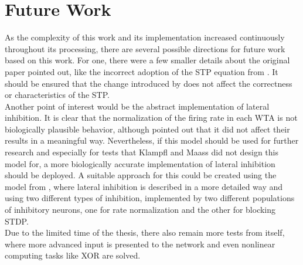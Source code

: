 \section{Future Work}
As the complexity of this work and its implementation increased continuously throughout its processing, there are several possible directions for future work based on this work. 
For one, there were a few smaller details about the original paper pointed out, like the incorrect adoption of the STP equation from \parencite{markram_wang_tsodyks_1998}. It should be ensured that the change introduced by \parencite{klampfl_maass_2013} does not affect the correctness or characteristics of the STP.\\
Another point of interest would be the abstract implementation of lateral inhibition. It is clear that the normalization of the firing rate in each WTA is not biologically plausible behavior, although \parencite{klampfl_maass_2013} pointed out that it did not affect their results in a meaningful way. Nevertheless, if this model should be used for further research and especially for tests that Klampfl and Maass did not design this model for, a more biologically accurate implementation of lateral inhibition should be deployed. A suitable approach for this could be created using the model from \parencite{häusler_maass_2017}, where lateral inhibition is described in a more detailed way and using two different types of inhibition, implemented by two different populations of inhibitory neurons, one for rate normalization and the other for blocking STDP.\\
Due to the limited time of the thesis, there also remain more tests from \parencite{klampfl_maass_2013} itself, where more advanced input is presented to the network and even nonlinear computing tasks like XOR are solved.
